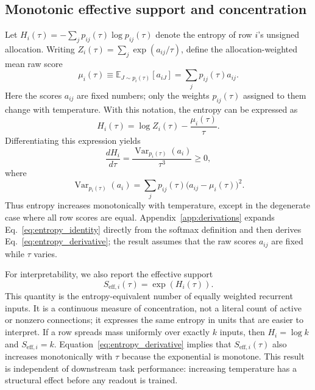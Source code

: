 \documentclass[11pt,a4paper]{article}
\begin{document}
\subsection{Monotonic effective support and concentration}

Let $H_i(\tau)=-\sum_j p_{ij}(\tau)\log p_{ij}(\tau)$ denote the entropy of row $i$'s unsigned allocation. Writing $Z_i(\tau)=\sum_j\exp(a_{ij}/\tau)$, define the allocation-weighted mean raw score
\[
  \mu_i(\tau)
  \equiv \mathbb{E}_{J\sim p_i(\tau)}[a_{iJ}]
  =\sum_j p_{ij}(\tau)a_{ij}.
\]
Here the scores $a_{ij}$ are fixed numbers; only the weights $p_{ij}(\tau)$ assigned to them change with temperature. With this notation, the entropy can be expressed as
\begin{equation}
  H_i(\tau)=\log Z_i(\tau)-\frac{\mu_i(\tau)}{\tau}.
  \label{eq:entropy_identity}
\end{equation}
Differentiating this expression yields
\begin{equation}
  \frac{d H_i}{d\tau}
  =\frac{\operatorname{Var}_{p_i(\tau)}(a_i)}{\tau^3}\ge 0,
  \label{eq:entropy_derivative}
\end{equation}
where
\[
  \operatorname{Var}_{p_i(\tau)}(a_i)
  =\sum_j p_{ij}(\tau)\bigl(a_{ij}-\mu_i(\tau)\bigr)^2.
\]
Thus entropy increases monotonically with temperature, except in the degenerate case where all row scores are equal. Appendix~\ref{app:derivations} expands Eq.~\eqref{eq:entropy_identity} directly from the softmax definition and then derives Eq.~\eqref{eq:entropy_derivative}; the result assumes that the raw scores $a_{ij}$ are fixed while $\tau$ varies.

For interpretability, we also report the effective support
\begin{equation}
  S_{\mathrm{eff},i}(\tau)=\exp(H_i(\tau)).
  \label{eq:effective_support}
\end{equation}
This quantity is the entropy-equivalent number of equally weighted recurrent inputs. It is a continuous measure of concentration, not a literal count of active or nonzero connections; it expresses the same entropy in units that are easier to interpret. If a row spreads mass uniformly over exactly $k$ inputs, then $H_i=\log k$ and $S_{\mathrm{eff},i}=k$. Equation~\ref{eq:entropy_derivative} implies that $S_{\mathrm{eff},i}(\tau)$ also increases monotonically with $\tau$ because the exponential is monotone. This result is independent of downstream task performance: increasing temperature has a structural effect before any readout is trained.
\end{document}
